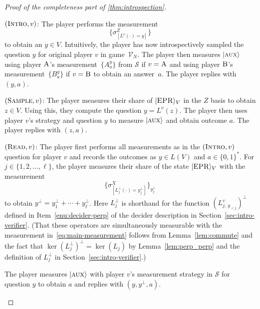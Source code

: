 \documentclass[11pt]{article}
\theoremstyle{definition}
\newcommand{\ket}[1]{|#1\rangle}
\newcommand{\verifier}{\mathcal{V}}
\newcommand{\strategy}{\mathscr{S}}
\newcommand{\labelstyle}[1]{\ensuremath{\textsc{#1}}\xspace}
\newcommand{\EPR}{\labelstyle{EPR}}
\newcommand{\aux}{\labelstyle{aux}}
\newcommand{\trole}{\ensuremath{v}}
\newcommand{\alice}{\labelstyle{A}}
\newcommand{\bob}{\labelstyle{B}}
\newcommand{\typestyle}[1]{\ensuremath{\textsc{#1}}\xspace}
\newcommand{\Sample}{\typestyle{Sample}}
\newcommand{\Read}{\typestyle{Read}}
\newcommand{\Introspect}{\typestyle{Intro}}
\begin{document}
\begin{proof}[Proof of the completeness part of \cref{thm:introspection}]
  \begin{description}
  \item $(\Introspect, \trole)$: The player performs the measurement
    \begin{equation}
      \label{eq:main-measurement}
      \bigl\{ \sigma^Z_{[L^\trole(\cdot) = y]} \bigr\}
    \end{equation}
    to obtain an $y\in V$.
    Intuitively, the player has now introspectively sampled the question $y$ for
    original player $\trole$ in game~$\verifier_N$.
    The player then measures $\ket{\aux}$ using player $\alice$'s
    measurement~$\{A^y_a\}$ from $\strategy$ if $v = \alice$ and using player
    $\bob$'s measurement~$\{B^y_a\}$ if $\trole = \bob$ to obtain an answer~$a$.
    The player replies with $(y,a)$.
  \item $(\Sample, \trole)$: The player measures their share of $\ket{\EPR}_V$
    in the $Z$ basis to obtain $z \in V$.
    Using this, they compute the question $y = L^\trole(z)$.
    The player then uses player $v$'s strategy and question $y$ to measure
    $\ket{\aux}$ and obtain outcome $a$.
    The player replies with $(z, a)$.
  \item $(\Read, \trole)$: The player first performs all measurements as in the
    $(\Introspect, \trole)$ question for player $\trole$ and records the
    outcomes as $y\in L(V)$ and $a\in\{0,1\}^*$.
    For $j\in \{1, 2, \ldots, \ell\}$, the player measures their share of the state
    $\ket{\EPR}_V$ with the measurement
\begin{equation}
      \label{eq:perp-measurement}
      \big\{\sigma^X_{[L_j^\perp (\cdot) = y_j^\perp]} \big\}_{y_j^\perp}
    \end{equation}
    to obtain $y^\perp = y_1^\perp + \cdots + y_\ell^\perp$.
    Here $L_j^\perp$ is shorthand for the function $(L^{\trole}_{j,\,
      y_{<j}})^\perp$ defined in Item~\ref{enu:decider-perp} of the decider
    description in Section~\ref{sec:intro-verifier}.
    (That these operators are simultaneously measurable with the measurement
    in~\eqref{eq:main-measurement} follows from Lemma~\ref{lem:commute} and the
    fact that $\ker(L^\perp_{j})^\perp = \ker(L_{j})$ by
    Lemma~\ref{lem:perp_perp} and the definition of $L^\perp_{j}$ in
    Section~\ref{sec:intro-verifier}.)
    
    The player measures $\ket{\aux}$ with player $\trole$'s measurement strategy
    in $\strategy$ for question $y$ to obtain $a$ and replies with
    $(y,y^\perp,a)$.


\end{description}
\end{proof}
\end{document}
